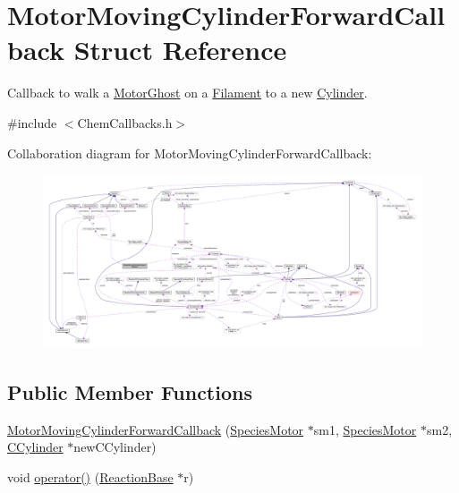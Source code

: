 \hypertarget{structMotorMovingCylinderForwardCallback}{\section{Motor\+Moving\+Cylinder\+Forward\+Callback Struct Reference}
\label{structMotorMovingCylinderForwardCallback}
}


Callback to walk a \hyperlink{classMotorGhost}{Motor\+Ghost} on a \hyperlink{classFilament}{Filament} to a new \hyperlink{classCylinder}{Cylinder}.  




{\ttfamily \#include $<$Chem\+Callbacks.\+h$>$}



Collaboration diagram for Motor\+Moving\+Cylinder\+Forward\+Callback\+:\nopagebreak
\begin{figure}[H]
\begin{center}
\leavevmode
\includegraphics[width=350pt]{structMotorMovingCylinderForwardCallback__coll__graph}
\end{center}
\end{figure}
\subsection*{Public Member Functions}
\begin{DoxyCompactItemize}
\item 
\hyperlink{structMotorMovingCylinderForwardCallback_a53e91b08cc575dd3d9ee154f2b6e07fb}{Motor\+Moving\+Cylinder\+Forward\+Callback} (\hyperlink{classSpeciesMotor}{Species\+Motor} $\ast$sm1, \hyperlink{classSpeciesMotor}{Species\+Motor} $\ast$sm2, \hyperlink{classCCylinder}{C\+Cylinder} $\ast$new\+C\+Cylinder)
\item 
void \hyperlink{structMotorMovingCylinderForwardCallback_a2b4b90a88f016b07e2d42589b456aab4}{operator()} (\hyperlink{classReactionBase}{Reaction\+Base} $\ast$r)
\end{DoxyCompactItemize}
